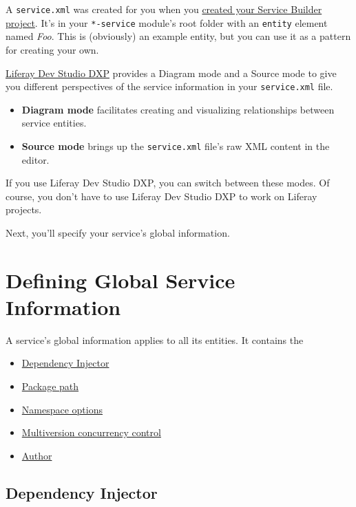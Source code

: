 A \texttt{service.xml} was created for you when you
\href{/docs/7-2/appdev/-/knowledge_base/a/creating-a-service-builder-project}{created
your Service Builder project}. It's in your \texttt{*-service} module's
root folder with an \texttt{entity} element named \emph{Foo}. This is
(obviously) an example entity, but you can use it as a pattern for
creating your own.

\href{/docs/7-2/reference/-/knowledge_base/r/liferay-dev-studio}{Liferay
Dev Studio DXP} provides a Diagram mode and a Source mode to give you
different perspectives of the service information in your
\texttt{service.xml} file.

\begin{itemize}
\tightlist
\item
  \textbf{Diagram mode} facilitates creating and visualizing
  relationships between service entities.
\item
  \textbf{Source mode} brings up the \texttt{service.xml} file's raw XML
  content in the editor.
\end{itemize}

If you use Liferay Dev Studio DXP, you can switch between these modes.
Of course, you don't have to use Liferay Dev Studio DXP to work on
Liferay projects.

Next, you'll specify your service's global information.

\chapter{Defining Global Service
Information}\label{defining-global-service-information}

A service's global information applies to all its entities. It contains
the

\begin{itemize}
\tightlist
\item
  \hyperref[dependency-injector]{Dependency Injector}
\item
  \hyperref[package-path]{Package path}
\item
  \hyperref[namespace-options]{Namespace options}
\item
  \hyperref[multiversion-concurrency-control-mvcc]{Multiversion
  concurrency control}
\item
  \hyperref[author]{Author}
\end{itemize}

\section{Dependency Injector}\label{dependency-injector}

